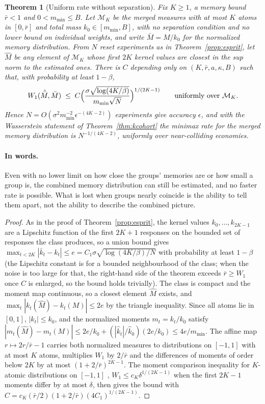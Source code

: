\documentclass[12pt]{article}
\newtheorem{theorem}{Theorem}[section]
\theoremstyle{definition}
\theoremstyle{remark}
\begin{document}
\begin{theorem}[Uniform rate without separation]\label{thm:uniformw1}
Fix $K\ge1$, a memory bound $\bar r<1$ and $0<m_{\min}\le B$. Let $\mathcal M_K$ be the merged measures with at most $K$ atoms in $[0,\bar r]$ and total mass $k_0\in[m_{\min},B]$, with no separation condition and no lower bound on individual weights, and write $\bar M=M/k_0$ for the normalized memory distribution. From $N$ reset experiments as in Theorem~\ref{prop:esprit}, let $\hat M$ be any element of $\mathcal M_K$ whose first $2K$ kernel values are closest in the sup norm to the estimated ones. There is $C$ depending only on $(K,\bar r,a,\kappa,B)$ such that, with probability at least $1-\beta$,
\[
W_1(\hat{\bar M},\bar M)\;\le\;C\Bigl(\frac{\sigma\sqrt{\log(4K/\beta)}}{m_{\min}\sqrt N}\Bigr)^{1/(2K-1)}\qquad\text{uniformly over }\mathcal M_K .
\]
Hence $N=O(\sigma^2m_{\min}^{-2}\epsilon^{-(4K-2)})$ experiments give accuracy $\epsilon$, and with the Wasserstein statement of Theorem~\ref{thm:kcohort} the minimax rate for the merged memory distribution is $N^{-1/(4K-2)}$, uniformly over near-colliding economies.
\end{theorem}

\paragraph{In words.} Even with no lower limit on how close the groups' memories are or how small a group is, the combined memory distribution can still be estimated, and no faster rate is possible. What is lost when groups nearly coincide is the ability to tell them apart, not the ability to describe the combined picture.

\begin{proof}
As in the proof of Theorem~\ref{prop:esprit}, the kernel values $k_0,\ldots,k_{2K-1}$ are a Lipschitz function of the first $2K+1$ responses on the bounded set of responses the class produces, so a union bound gives $\max_{t<2K}|\bar k_t-k_t|\le e=C_1\sigma\sqrt{\log(4K/\beta)/N}$ with probability at least $1-\beta$ (the Lipschitz constant is for a bounded neighbourhood of the class; when the noise is too large for that, the right-hand side of the theorem exceeds $\bar r\ge W_1$ once $C$ is enlarged, so the bound holds trivially). The class is compact and the moment map continuous, so a closest element $\hat M$ exists, and $\max_t|k_t(\hat M)-k_t(M)|\le2e$ by the triangle inequality. Since all atoms lie in $[0,1]$, $|k_t|\le k_0$, and the normalized moments $m_t=k_t/k_0$ satisfy $|m_t(\hat M)-m_t(M)|\le2e/k_0+(|\hat k_t|/\hat k_0)(2e/k_0)\le4e/m_{\min}$. The affine map $r\mapsto2r/\bar r-1$ carries both normalized measures to distributions on $[-1,1]$ with at most $K$ atoms, multiplies $W_1$ by $2/\bar r$ and the differences of moments of order below $2K$ by at most $(1+2/\bar r)^{2K-1}$. The moment comparison inequality for $K$-atomic distributions on $[-1,1]$ \citep{wu2020}, $W_1\le c_K\delta^{1/(2K-1)}$ when the first $2K-1$ moments differ by at most $\delta$, then gives the bound with $C=c_K(\bar r/2)(1+2/\bar r)(4C_1)^{1/(2K-1)}$.
\end{proof}
\end{document}
